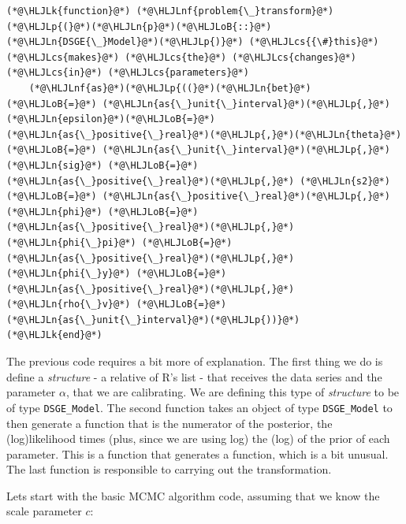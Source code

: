 \documentclass[12pt,a4paper]{article}
\newcommand{\HLJLk}[1]{\textcolor[RGB]{148,91,176}{\textbf{#1}}}
\newcommand{\HLJLn}[1]{#1}
\newcommand{\HLJLnf}[1]{\textcolor[RGB]{66,102,213}{#1}}
\newcommand{\HLJLoB}[1]{\textcolor[RGB]{102,102,102}{\textbf{#1}}}
\newcommand{\HLJLp}[1]{#1}
\newcommand{\HLJLcs}[1]{\textcolor[RGB]{153,153,119}{\textit{#1}}}
\begin{document}
\begin{lstlisting}
(*@\HLJLk{function}@*) (*@\HLJLnf{problem{\_}transform}@*)(*@\HLJLp{(}@*)(*@\HLJLn{p}@*)(*@\HLJLoB{::}@*)(*@\HLJLn{DSGE{\_}Model}@*)(*@\HLJLp{)}@*) (*@\HLJLcs{{\#}this}@*) (*@\HLJLcs{makes}@*) (*@\HLJLcs{the}@*) (*@\HLJLcs{changes}@*) (*@\HLJLcs{in}@*) (*@\HLJLcs{parameters}@*)
    (*@\HLJLnf{as}@*)(*@\HLJLp{((}@*)(*@\HLJLn{bet}@*) (*@\HLJLoB{=}@*) (*@\HLJLn{as{\_}unit{\_}interval}@*)(*@\HLJLp{,}@*) (*@\HLJLn{epsilon}@*)(*@\HLJLoB{=}@*)(*@\HLJLn{as{\_}positive{\_}real}@*)(*@\HLJLp{,}@*)(*@\HLJLn{theta}@*) (*@\HLJLoB{=}@*) (*@\HLJLn{as{\_}unit{\_}interval}@*)(*@\HLJLp{,}@*) (*@\HLJLn{sig}@*) (*@\HLJLoB{=}@*) (*@\HLJLn{as{\_}positive{\_}real}@*)(*@\HLJLp{,}@*) (*@\HLJLn{s2}@*) (*@\HLJLoB{=}@*) (*@\HLJLn{as{\_}positive{\_}real}@*)(*@\HLJLp{,}@*) (*@\HLJLn{phi}@*) (*@\HLJLoB{=}@*) (*@\HLJLn{as{\_}positive{\_}real}@*)(*@\HLJLp{,}@*) (*@\HLJLn{phi{\_}pi}@*) (*@\HLJLoB{=}@*) (*@\HLJLn{as{\_}positive{\_}real}@*)(*@\HLJLp{,}@*) (*@\HLJLn{phi{\_}y}@*) (*@\HLJLoB{=}@*) (*@\HLJLn{as{\_}positive{\_}real}@*)(*@\HLJLp{,}@*) (*@\HLJLn{rho{\_}v}@*) (*@\HLJLoB{=}@*) (*@\HLJLn{as{\_}unit{\_}interval}@*)(*@\HLJLp{))}@*)
(*@\HLJLk{end}@*)
\end{lstlisting}


The previous code requires a bit more of explanation. The first thing we do is define a \emph{structure} - a relative of R's list - that receives the data series and the parameter $\alpha$, that we are calibrating. We are defining this type of \emph{structure} to be of type \texttt{DSGE\_Model}. The second function takes an object of type \texttt{DSGE\_Model} to then generate a function that is the numerator of the posterior, the (log)likelihood times (plus, since we are using log) the (log) of the prior of each parameter. This is a function that generates a function, which is a bit unusual. The last function is responsible to carrying out the transformation.

Lets start with the basic MCMC algorithm code, assuming that we know the scale parameter $c$:
\end{document}
